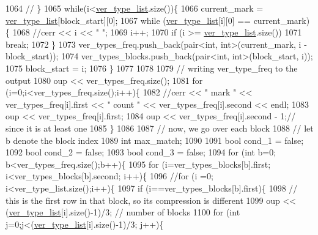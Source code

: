\begin{DoxyCode}
1064   \textcolor{comment}{// \}}
1065   \textcolor{keywordflow}{while}(i<\hyperlink{classmarked__graph__compressed_af2e3e55223d436628a02758dfae88493}{ver\_type\_list}.size())\{
1066     current\_mark = \hyperlink{classmarked__graph__compressed_af2e3e55223d436628a02758dfae88493}{ver\_type\_list}[block\_start][0];
1067     \textcolor{keywordflow}{while} (\hyperlink{classmarked__graph__compressed_af2e3e55223d436628a02758dfae88493}{ver\_type\_list}[i][0] == current\_mark)\{
1068       \textcolor{comment}{//cerr << i << " ";}
1069       i++;
1070       \textcolor{keywordflow}{if} (i >= \hyperlink{classmarked__graph__compressed_af2e3e55223d436628a02758dfae88493}{ver\_type\_list}.size())
1071         \textcolor{keywordflow}{break};
1072     \}
1073     ver\_types\_freq.push\_back(pair<int, int>(current\_mark, i - block\_start));
1074     ver\_types\_blocks.push\_back(pair<int, int>(block\_start, i));
1075     block\_start = i;
1076   \}
1077 
1078 
1079   \textcolor{comment}{// writing ver\_type\_freq to the output}
1080   oup << ver\_types\_freq.size();
1081   \textcolor{keywordflow}{for} (i=0;i<ver\_types\_freq.size();i++)\{
1082     \textcolor{comment}{//cerr << " mark " << ver\_types\_freq[i].first << " count " << ver\_types\_freq[i].second << endl;}
1083     oup << ver\_types\_freq[i].first;
1084     oup << ver\_types\_freq[i].second - 1;\textcolor{comment}{// since it is at least one}
1085   \}
1086 
1087   \textcolor{comment}{// now, we go over each block}
1088   \textcolor{comment}{// let b denote the block index}
1089   \textcolor{keywordtype}{int} max\_match;
1090 
1091   \textcolor{keywordtype}{bool} cond\_1 = \textcolor{keyword}{false};
1092   \textcolor{keywordtype}{bool} cond\_2 = \textcolor{keyword}{false};
1093   \textcolor{keywordtype}{bool} cond\_3 = \textcolor{keyword}{false};
1094   \textcolor{keywordflow}{for} (\textcolor{keywordtype}{int} b=0; b<ver\_types\_freq.size();b++)\{
1095     \textcolor{keywordflow}{for} (i=ver\_types\_blocks[b].first; i<ver\_types\_blocks[b].second; i++)\{
1096       \textcolor{comment}{//for (i =0; i<ver\_type\_list.size();i++)\{}
1097       \textcolor{keywordflow}{if} (i==ver\_types\_blocks[b].first)\{
1098         \textcolor{comment}{// this is the first row in that block, so its compression is different}
1099         oup << (\hyperlink{classmarked__graph__compressed_af2e3e55223d436628a02758dfae88493}{ver\_type\_list}[i].size()-1)/3; \textcolor{comment}{// number of blocks}
1100         \textcolor{keywordflow}{for} (\textcolor{keywordtype}{int} j=0;j<(\hyperlink{classmarked__graph__compressed_af2e3e55223d436628a02758dfae88493}{ver\_type\_list}[i].size()-1)/3; j++)\{

\end{DoxyCode}

